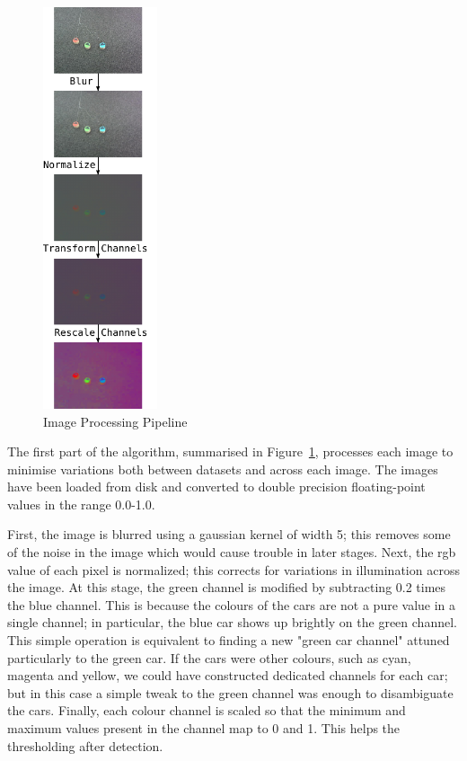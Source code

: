 \documentclass{article}
\begin{document}
\begin{figure}[htbp!] 
  \centering
    \includegraphics[width=0.3\textwidth]{../Drawings/processing.pdf}
    \caption{Image Processing Pipeline}
    \label{fig:processing}
\end{figure}

The first part of the algorithm, summarised in Figure~\ref{fig:processing}, processes each image to minimise variations both between datasets and across each image. The images have been loaded from disk and converted to double precision floating-point values in the range 0.0-1.0.

First, the image is blurred using a gaussian kernel of width 5; this removes some of the noise in the image which would cause trouble in later stages. Next, the rgb value of each pixel is normalized; this corrects for variations in illumination across the image. At this stage, the green channel is modified by subtracting 0.2 times the blue channel. This is because the colours of the cars are not a pure value in a single channel; in particular, the blue car shows up brightly on the green channel. This simple operation is equivalent to finding a new "green car channel" attuned particularly to the green car. If the cars were other colours, such as cyan, magenta and yellow, we could have constructed dedicated channels for each car; but in this case a simple tweak to the green channel was enough to disambiguate the cars. Finally, each colour channel is scaled so that the minimum and maximum values present in the channel map to 0 and 1. This helps the thresholding after detection.
\end{document}
